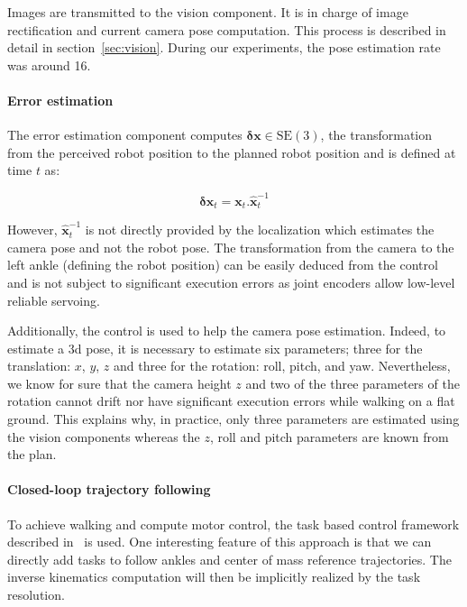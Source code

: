 Images are transmitted to the vision component. It is in charge of
image rectification and current camera pose computation. This process
is described in detail in section~\ref{sec:vision}.  During our
experiments, the pose estimation rate was around 16\hertz.


\paragraph{Error estimation}

The error estimation component computes $\mathbf{\delta x} \in
\text{SE}(3)$, the transformation from the perceived robot position to
the planned robot position and is defined at time $t$ as:

\begin{equation} \label{eq:errorpos}
  \mathbf{\delta x}_t = \mathbf{x}_t . \hat{\mathbf{x}}_t^{-1}
\end{equation}

However, $\hat{\mathbf{x}}_t^{-1}$ is not directly provided by the
localization which estimates the camera pose and not the robot
pose. The transformation from the camera to the left ankle (defining
the robot position) can be easily deduced from the control and is not
subject to significant execution errors as joint encoders allow
low-level reliable servoing.

Additionally, the control is used to help the camera pose
estimation. Indeed, to estimate a 3d pose, it is necessary to estimate
six parameters; three for the translation: $x$, $y$, $z$ and three for
the rotation: roll, pitch, and yaw. Nevertheless, we know for sure
that the camera height $z$ and two of the three parameters of the
rotation cannot drift nor have significant execution errors while
walking on a flat ground. This explains why, in practice, only three
parameters are estimated using the vision components whereas the $z$,
roll and pitch parameters are known from the plan.

\paragraph{Closed-loop trajectory following}

To achieve walking and compute motor control, the task based control
framework described in~\cite{Mansard09icar} is used. One interesting
feature of this approach is that we can directly add tasks to follow
ankles and center of mass reference trajectories. The inverse
kinematics computation will then be implicitly realized by the task
resolution.

